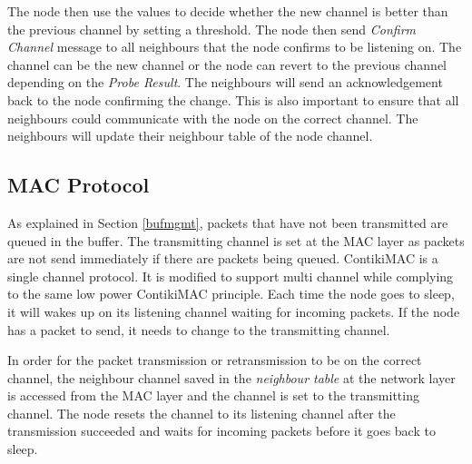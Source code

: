 The node then use the values to decide whether the new channel is better than the previous channel by setting a threshold. The node then send \textit{Confirm Channel} message to all neighbours that the node confirms to be listening on. The channel can be the new channel or the node can revert to the previous channel depending on the \textit{Probe Result}. The neighbours will send an acknowledgement back to the node confirming the change. This is also important to ensure that all neighbours could communicate with the node on the correct channel. The neighbours will update their neighbour table of the node channel. 

\subsection{MAC Protocol}
As explained in Section \ref{bufmgmt}, packets that have not been transmitted are queued in the buffer. The transmitting channel is set at the MAC layer as packets are not send immediately if there are packets being queued. ContikiMAC is a single channel protocol. It is modified to support multi channel while complying to the same low power ContikiMAC principle. Each time the node goes to sleep, it will wakes up on its listening channel waiting for incoming packets. If the node has a packet to send, it needs to change to the transmitting channel.

In order for the packet transmission or retransmission to be on the correct channel, the neighbour channel saved in the \textit{neighbour table} at the network layer is accessed from the MAC layer and the channel is set to the transmitting channel. The node resets the channel to its listening channel after the transmission succeeded and waits for incoming packets before it goes back to sleep.




